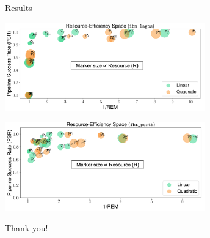 \documentclass[11pt,aspectratio=1610,xcolor=dvipsnames]{beamer}
\begin{document}
\begin{frame}{Results}
	\begin{center}
		\includegraphics[width=0.65\textwidth]{psr1.png}

		\includegraphics[width=0.65\textwidth]{psr2.png}
	\end{center}
\end{frame}


\begin{frame}[standout]
	Thank you!
\end{frame}
\end{document}
